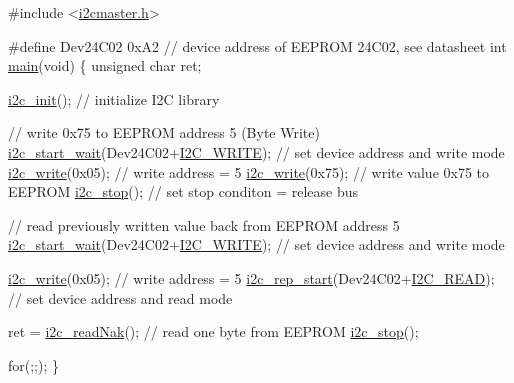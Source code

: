 \begin{DoxyCode}
\textcolor{preprocessor}{#include <\hyperlink{i2cmaster_8h}{i2cmaster.h}>}


\textcolor{preprocessor}{#define Dev24C02  0xA2      // device address of EEPROM 24C02, see datasheet}
\textcolor{preprocessor}{}
\textcolor{keywordtype}{int} \hyperlink{main_8c_ae66f6b31b5ad750f1fe042a706a4e3d4}{main}(\textcolor{keywordtype}{void})
\{
    \textcolor{keywordtype}{unsigned} \textcolor{keywordtype}{char} ret;

    \hyperlink{group__pfleury__ic2master_ga5730d9445429351b9f750084c5cb5aae}{i2c\_init}();                             \textcolor{comment}{// initialize I2C library}

    \textcolor{comment}{// write 0x75 to EEPROM address 5 (Byte Write) }
    \hyperlink{group__pfleury__ic2master_ga71640d1526479df4629c3024c9ada476}{i2c\_start\_wait}(Dev24C02+\hyperlink{group__pfleury__ic2master_ga9536bf85bced4f4e549a82fb18eb6140}{I2C\_WRITE});     \textcolor{comment}{// set device address and write mode}
    \hyperlink{group__pfleury__ic2master_gadd947aade44ed6b7f92265f9dec4a711}{i2c\_write}(0x05);                        \textcolor{comment}{// write address = 5}
    \hyperlink{group__pfleury__ic2master_gadd947aade44ed6b7f92265f9dec4a711}{i2c\_write}(0x75);                        \textcolor{comment}{// write value 0x75 to EEPROM}
    \hyperlink{group__pfleury__ic2master_gad35d4e4f52ca74b503d5e5e1e0a3f5f3}{i2c\_stop}();                             \textcolor{comment}{// set stop conditon = release bus}


    \textcolor{comment}{// read previously written value back from EEPROM address 5 }
    \hyperlink{group__pfleury__ic2master_ga71640d1526479df4629c3024c9ada476}{i2c\_start\_wait}(Dev24C02+\hyperlink{group__pfleury__ic2master_ga9536bf85bced4f4e549a82fb18eb6140}{I2C\_WRITE});     \textcolor{comment}{// set device address and write mode}

    \hyperlink{group__pfleury__ic2master_gadd947aade44ed6b7f92265f9dec4a711}{i2c\_write}(0x05);                        \textcolor{comment}{// write address = 5}
    \hyperlink{group__pfleury__ic2master_ga70c934b61f3c6ba8524104a1d7197d30}{i2c\_rep\_start}(Dev24C02+\hyperlink{group__pfleury__ic2master_gab5c0fbe837494c5f9130a5914854250d}{I2C\_READ});       \textcolor{comment}{// set device address and read mode}

    ret = \hyperlink{group__pfleury__ic2master_gad89e839fc17b05fbb5dd79897c55234e}{i2c\_readNak}();                    \textcolor{comment}{// read one byte from EEPROM}
    \hyperlink{group__pfleury__ic2master_gad35d4e4f52ca74b503d5e5e1e0a3f5f3}{i2c\_stop}();

    \textcolor{keywordflow}{for}(;;);
\}
\end{DoxyCode}
